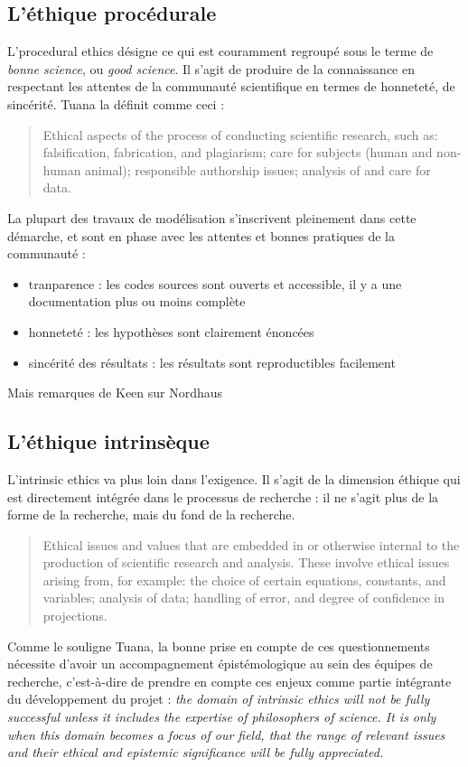 \subsection{L'éthique procédurale}

L'\Gls{procedural ethics} désigne ce qui est couramment regroupé sous le terme de \textit{bonne science}, ou \textit{good science}. Il s'agit de produire de la connaissance en respectant les attentes de la communauté scientifique en termes de honneteté, de sincérité. Tuana \cite{tuana_leading_2010}  la définit comme ceci : 

\begin{quote}
Ethical aspects of the process of conducting scientific research, such as: falsification, fabrication, and plagiarism; care for subjects (human and non-human animal); responsible authorship issues; analysis of and care for data.
\end{quote}
La plupart des travaux de modélisation s'inscrivent pleinement dans cette démarche, et sont en phase avec les attentes et bonnes pratiques de la communauté : 

\begin{itemize}
    \item tranparence : les codes sources sont ouverts et accessible, il y a une documentation plus ou moins complète
    \item honneteté : les hypothèses sont clairement énoncées
    \item sincérité des résultats : les résultats sont reproductibles facilement
\end{itemize}

\begin{tcolorbox}
    Mais remarques de Keen sur Nordhaus
\end{tcolorbox}

\subsection{L'éthique intrinsèque}

L'\Gls{intrinsic ethics} va plus loin dans l'exigence. Il s'agit de la dimension éthique qui est directement intégrée dans le processus de recherche : il ne s'agit plus de la forme de la recherche, mais du fond de la recherche. 

\begin{quote}
Ethical issues and values that are embedded in or otherwise internal to the production of scientific research and analysis. These involve ethical issues arising from, for example: the choice of certain equations, constants, and variables; analysis of data; handling of error, and degree of confidence in projections.
\end{quote}
Comme le souligne Tuana, la bonne prise en compte de ces questionnements nécessite d'avoir un accompagnement épistémologique au sein des équipes de recherche, c'est-à-dire de prendre en compte ces enjeux comme partie intégrante du développement du projet : \emph{the domain of intrinsic ethics will not be fully successful unless it includes the expertise of philosophers of science. It is only when this domain becomes a focus of our field, that the range of relevant issues and their ethical and epistemic significance will be fully appreciated.}

